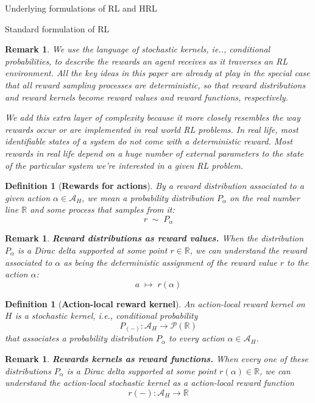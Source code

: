 \documentclass[11pt]{article}
\newtheorem{definition}[subsubsection]{Definition}
\newtheorem{remark}[subsubsection]{Remark}
\begin{document}
\begin{section}{Underlying formulations of RL and HRL}
\begin{subsection}{Standard formulation of RL}
\begin{remark}
{\bf }
\normalfont
We use the language of stochastic kernels, ie.., conditional probabilities, to describe the rewards an agent receives as it traverses an RL environment. All the key ideas in this paper are already at play in the special case that all reward sampling processes are deterministic, so that reward distributions and reward kernels become reward values and reward functions, respectively.

We add this extra layer of complexity because {\em it more closely resembles the way rewards occur or are implemented in real world RL problems}. In real life, most identifiable states of a system do not come with a deterministic reward. Most rewards in real life depend on a huge number of external parameters to the state of the particular system we're interested in a given RL problem.
\end{remark}
 
 \begin{definition}[{\bf Rewards for actions}]
 \normalfont
By a {\em reward distribution} associated to a given action $\alpha\in\mathcal{A}_{H}$, we mean a probability distribution $P_{\!\alpha}$ on the real number line $\mathbb{R}$ and some process that samples from it:
$$
r\;\sim\;P_{\!\alpha}
$$
\end{definition}

\begin{remark}
{\bf Reward distributions as reward values.}
\normalfont
When the distribution $P_{\!\alpha}$ is a Dirac delta supported at some point $r\in\mathbb{R}$, we can understand the {\em reward associated to} $\alpha$ as being the deterministic assignment of the reward value $r$ to the action $\alpha$:
$$
a\;\mapsto\;r(\alpha)
$$
\end{remark}

\begin{definition}[{\bf Action-local reward kernel}]
An {\em action-local reward kernel} on $H$ is a stochastic kernel, i.e., conditional probability
$$
P_{(-)}:\mathcal{A}_{H}\longrightarrow \mathcal{P}(\mathbb{R})
$$
that associates a probability distribution $P_{\alpha}$ to every action $\alpha\in\mathcal{A}_{H}$.
\end{definition}

\begin{remark}
{\bf Rewards kernels as reward functions.}
\normalfont
When every one of these distributions $P_{\!\alpha}$ is a Dirac delta supported at some point $r(\alpha)\in\mathbb{R}$, we can understand the action-local stochastic kernel as a {\em action-local reward function}
$$
r(-):\mathcal{A}_{H}\longrightarrow\mathbb{R}
$$
\end{remark}


\end{subsection}
\end{section}
\end{document}
